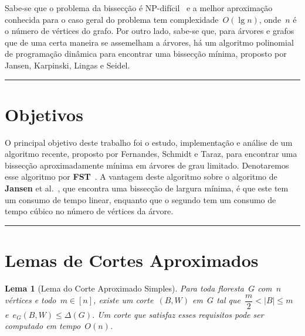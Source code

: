 \documentclass[a0,portrait]{a0poster}
\newtheorem{lem}{Lema}
\begin{document}
\begin{multicols}{3}
    Sabe-se que o problema da bissecção é NP-difícil~\cite{GareyJS76}
    e a melhor aproximação conhecida para o caso geral do problema tem 
    complexidade~$O(\lg n)$, onde~$n$ é o número de vértices 
    do grafo. 
    Por outro lado, sabe-se que, para árvores e grafos que de uma 
    certa maneira se assemelham a árvores, há um algoritmo polinomial 
    de programação dinâmica para encontrar uma bissecção mínima, 
    proposto por Jansen, Karpinski, Lingas e Seidel. 

\noindent\rule[0.5ex]{\linewidth}{1pt}



\color{Black} %


\section*{Objetivos}

    O principal objetivo deste trabalho foi o estudo, implementação e 
    análise de um algoritmo recente, proposto por Fernandes, Schmidt e 
    Taraz, para encontrar uma bissecção 
    aproximadamente mínima em árvores de grau limitado. Denotaremos
    esse algoritmo por \textbf{FST}~\cite{Schmidt15}. 
    A vantagem deste algoritmo sobre o algoritmo de \textbf{Jansen} et 
    al.~\cite{JansenKLS01}, que encontra uma bissecção de largura 
    mínima, é que este tem um consumo de tempo linear, enquanto que o 
    segundo tem um consumo de tempo cúbico no número de vértices da 
    árvore. 

\noindent\rule[0.5ex]{\linewidth}{1pt}


\section* {Lemas de Cortes Aproximados}

\begin{lem}[Lema do Corte Aproximado Simples]
    Para toda floresta~$G$ com~$n$ vértices e todo~${m \in [n]}$,
    existe um corte~$(B,W)$ em~$G$ tal 
    que~${\dfrac{m}{2} <|B| \le m}$ e~${e_G(B,W) \le \Delta(G)}$.
    Um corte que satisfaz esses requisitos pode ser computado em
    tempo~$O(n)$.
\end{lem}


\end{multicols}
\end{document}
